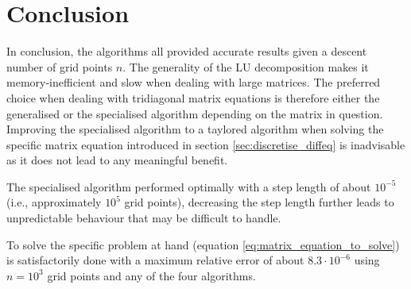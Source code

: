 \documentclass[reprint,english]{revtex4-1}
\begin{document}
\section{Conclusion}
In conclusion, the algorithms all provided accurate results given a descent number of grid points \(n\). The generality of the LU decomposition makes it memory-inefficient and slow when dealing with large matrices. The preferred choice when dealing with tridiagonal matrix equations is therefore either the generalised or the specialised algorithm depending on the matrix in question. Improving the specialised algorithm to a taylored algorithm when solving the specific matrix equation introduced in section \ref{sec:discretise_diffeq} is inadvisable as it does not lead to any meaningful benefit.

The specialised algorithm performed optimally with a step length of about \(10^{-5}\) (i.e., approximately \(10^5\) grid points), decreasing the step length further leads to unpredictable behaviour that may be difficult to handle.

To solve the specific problem at hand (equation \eqref{eq:matrix_equation_to_solve}) is satisfactorily done with a maximum relative error of about \(8.3\cdot10^{-6}\) using \(n=10^3\) grid points and any of the four algorithms.
\nocite{lecture_ode}\nocite{lecture_linalg}


\end{document}
